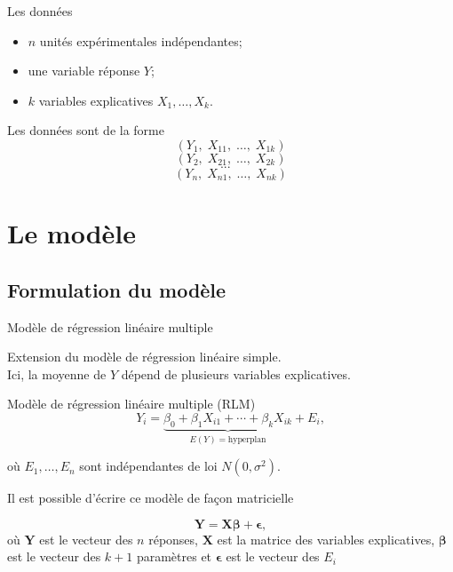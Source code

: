 \documentclass{BeamerTemplate}
\begin{document}
\begin{frame}[t]{Les données}
\begin{itemize}
\item $n$ unités expérimentales indépendantes;
\item  une variable réponse $Y$;
\item  $k$ variables explicatives $X_1,\ldots,X_k$.
\end{itemize}

\bigskip
Les données sont de la forme
$$(Y_1,\;X_{11},\;\ldots,\;X_{1k})$$
$$(Y_2,\;X_{21},\;\ldots,\;X_{2k})$$
$$\ \ ... \ \ \ \ \ \ $$
$$(Y_n,\;X_{n1},\;\ldots,\;X_{nk})$$
\end{frame}
\section[Modèle]{Le modèle}

\subsection{Formulation du modèle}

\begin{frame}[t]{Modèle de régression linéaire multiple}

Extension du modèle de régression linéaire simple. \\
\alert{Ici, la  moyenne de $Y$ dépend de plusieurs variables explicatives}.

\begin{Boite}{Modèle de régression linéaire multiple (RLM)}
$$
Y_i=\underbrace{\beta_0+\beta_1X_{i1}+\cdots+\beta_kX_{ik}}_{E(Y)=\text{hyperplan}}+E_i,
$$

où $E_1,\ldots,E_n$ sont indépendantes de loi $N(0,\sigma^2)$.
\end{Boite}


Il est possible d'écrire ce modèle de façon matricielle

$$\boldsymbol{Y}=\boldsymbol{X\beta}+\boldsymbol{\epsilon},$$
où $\boldsymbol{Y}$ est le vecteur des $n$ réponses, $\boldsymbol{X}$ est la matrice des variables explicatives, $\boldsymbol{\beta}$ est le vecteur des $k+1$ paramètres et $\boldsymbol{\epsilon}$ est le vecteur des $E_i$
\end{frame}
\end{document}
